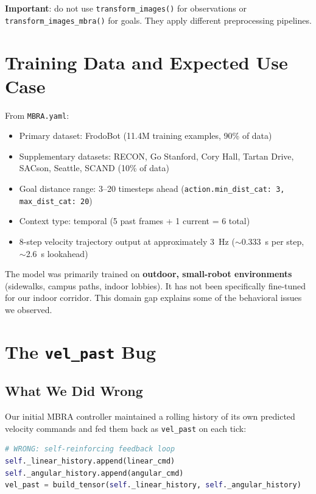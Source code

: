 \documentclass[11pt,a4paper]{article}
\begin{document}
\textbf{Important}: do not use \texttt{transform\_images()} for observations
or \texttt{transform\_images\_mbra()} for goals.  They apply different
preprocessing pipelines.

\section{Training Data and Expected Use Case}

From \texttt{MBRA.yaml}:

\begin{itemize}[nosep]
  \item Primary dataset: FrodoBot (11.4M training examples, 90\% of data)
  \item Supplementary datasets: RECON, Go Stanford, Cory Hall, Tartan Drive,
    SACson, Seattle, SCAND (10\% of data)
  \item Goal distance range: 3--20 timesteps ahead
    (\texttt{action.min\_dist\_cat: 3, max\_dist\_cat: 20})
  \item Context type: temporal (5 past frames + 1 current = 6 total)
  \item 8-step velocity trajectory output at approximately 3~Hz
    ($\sim$0.333~s per step, $\sim$2.6~s lookahead)
\end{itemize}

The model was primarily trained on \textbf{outdoor, small-robot environments}
(sidewalks, campus paths, indoor lobbies).  It has not been specifically
fine-tuned for our indoor corridor.  This domain gap explains some of the
behavioral issues we observed.

\section{The \texttt{vel\_past} Bug}
\label{sec:velpast-bug}

\subsection{What We Did Wrong}

Our initial MBRA controller maintained a rolling history of its own predicted
velocity commands and fed them back as \texttt{vel\_past} on each tick:

\begin{lstlisting}[language=Python]
# WRONG: self-reinforcing feedback loop
self._linear_history.append(linear_cmd)
self._angular_history.append(angular_cmd)
vel_past = build_tensor(self._linear_history, self._angular_history)
\end{lstlisting}
\end{document}
